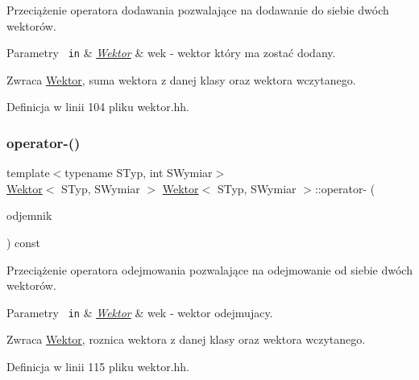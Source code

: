 Przeciążenie operatora dodawania pozwalające na dodawanie do siebie dwóch wektorów.


\begin{DoxyParams}[1]{Parametry}
\mbox{\texttt{ in}}  & {\em \mbox{\hyperlink{class_wektor}{Wektor}}} & wek -\/ wektor który ma zostać dodany. \\
\hline
\end{DoxyParams}
\begin{DoxyReturn}{Zwraca}
\mbox{\hyperlink{class_wektor}{Wektor}}, suma wektora z danej klasy oraz wektora wczytanego. 
\end{DoxyReturn}


Definicja w linii 104 pliku wektor.\+hh.

\mbox{\label{class_wektor_a1560f385977f9b4ee942347e511cbd03}} 
\subsubsection{\texorpdfstring{operator-\/()}{operator-()}}
{\footnotesize\ttfamily template$<$typename S\+Typ, int S\+Wymiar$>$ \\
\mbox{\hyperlink{class_wektor}{Wektor}}$<$ S\+Typ, S\+Wymiar $>$ \mbox{\hyperlink{class_wektor}{Wektor}}$<$ S\+Typ, S\+Wymiar $>$\+::operator-\/ (\begin{DoxyParamCaption}\item[{const \mbox{\hyperlink{class_wektor}{Wektor}}$<$ S\+Typ, S\+Wymiar $>$ \&}]{odjemnik }\end{DoxyParamCaption}) const}

Przeciążenie operatora odejmowania pozwalające na odejmowanie od siebie dwóch wektorów.


\begin{DoxyParams}[1]{Parametry}
\mbox{\texttt{ in}}  & {\em \mbox{\hyperlink{class_wektor}{Wektor}}} & wek -\/ wektor odejmujacy. \\
\hline
\end{DoxyParams}
\begin{DoxyReturn}{Zwraca}
\mbox{\hyperlink{class_wektor}{Wektor}}, roznica wektora z danej klasy oraz wektora wczytanego. 
\end{DoxyReturn}


Definicja w linii 115 pliku wektor.\+hh.

